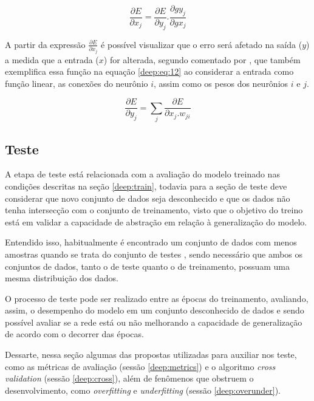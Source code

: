 \begin{equation}
    \label{deep:eq:11}
    \frac{\partial E}{\partial x_j} = \frac{\partial E}{\partial y_j} . \frac{\partial g y_j}{\partial g x_j}
\end{equation}

A partir da expressão $\frac{\partial E}{\partial x_j}$ é possível visualizar que o erro será afetado na saída ($y$) a medida que a entrada ($x$) for alterada, segundo comentado por \cite{rumelhart1986learning}, que também exemplifica essa função na equação \ref{deep:eq:12} ao considerar a entrada como função linear, as conexões do neurônio $i$, assim como os pesos dos neurônios $i$ e $j$.

\begin{equation}
    \label{deep:eq:12}
    \frac{\partial E}{\partial y_j} = \sum_j \frac{\partial E}{\partial x_j . w_{ji}}
\end{equation}


\subsection{Teste}
\label{deep:test}

A etapa de teste está relacionada com a avaliação do modelo treinado nas condições descritas na seção \ref{deep:train}, todavia para a seção de teste deve considerar que novo conjunto de dados seja desconhecido e que os dados não tenha intersecção com o conjunto de treinamento, visto que o objetivo do treino está em validar a capacidade de abstração em relação à generalização do modelo.

Entendido isso, habitualmente é encontrado um conjunto de dados com menos amostras quando se trata do conjunto de testes \cite{Goodfellow2016}, sendo necessário que ambos os conjuntos de dados, tanto o de teste quanto o de treinamento, possuam uma mesma distribuição dos dados.

O processo de teste pode ser realizado entre as épocas do treinamento, avaliando, assim, o desempenho do modelo em um conjunto desconhecido de dados e sendo possível avaliar se a rede está ou não melhorando a capacidade de generalização de acordo com o decorrer das épocas.

Dessarte, nessa seção algumas das propostas utilizadas para auxiliar nos teste, como as métricas de avaliação (sessão \ref{deep:metrics}) e o algoritmo \textit{cross validation} (sessão \ref{deep:cross}), além de fenômenos que obstruem o desenvolvimento, como \textit{overfitting} e \textit{underfitting} (sessão \ref{deep:overunder}).


